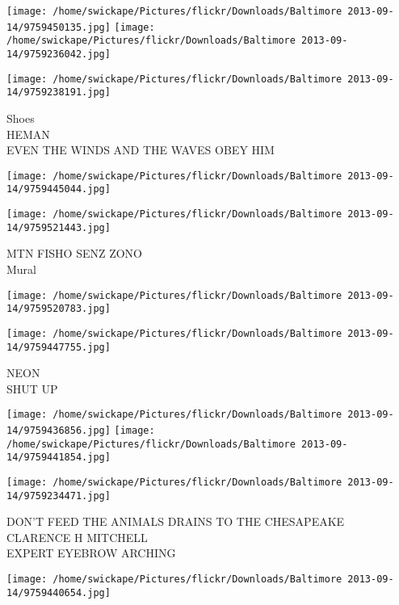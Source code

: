 \documentclass[10pt,letterpaper]{article}
\begin{document}
\texttt{[image: /home/swickape/Pictures/flickr/Downloads/Baltimore 2013-09-14/9759450135.jpg]}
\texttt{[image: /home/swickape/Pictures/flickr/Downloads/Baltimore 2013-09-14/9759236042.jpg]}

\vspace{0.25in}
\texttt{[image: /home/swickape/Pictures/flickr/Downloads/Baltimore 2013-09-14/9759238191.jpg]}

Shoes\\
HEMAN\\
EVEN THE WINDS AND THE WAVES OBEY HIM\\
\pagebreak

\texttt{[image: /home/swickape/Pictures/flickr/Downloads/Baltimore 2013-09-14/9759445044.jpg]}

\vspace{0.25in}
\texttt{[image: /home/swickape/Pictures/flickr/Downloads/Baltimore 2013-09-14/9759521443.jpg]}

MTN FISHO SENZ ZONO\\
Mural\\
\pagebreak

\texttt{[image: /home/swickape/Pictures/flickr/Downloads/Baltimore 2013-09-14/9759520783.jpg]}

\vspace{0.25in}
\texttt{[image: /home/swickape/Pictures/flickr/Downloads/Baltimore 2013-09-14/9759447755.jpg]}

NEON\\
SHUT UP\\
\pagebreak

\texttt{[image: /home/swickape/Pictures/flickr/Downloads/Baltimore 2013-09-14/9759436856.jpg]}
\texttt{[image: /home/swickape/Pictures/flickr/Downloads/Baltimore 2013-09-14/9759441854.jpg]}

\vspace{0.25in}
\texttt{[image: /home/swickape/Pictures/flickr/Downloads/Baltimore 2013-09-14/9759234471.jpg]}

DON'T FEED THE ANIMALS DRAINS TO THE CHESAPEAKE\\
CLARENCE H MITCHELL\\
EXPERT EYEBROW ARCHING\\
\pagebreak

\texttt{[image: /home/swickape/Pictures/flickr/Downloads/Baltimore 2013-09-14/9759440654.jpg]}
\end{document}
